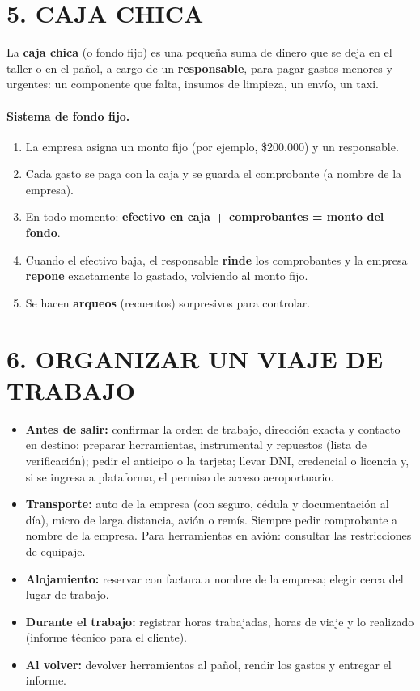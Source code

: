\section*{5. CAJA CHICA}

La \textbf{caja chica} (o fondo fijo) es una pequeña suma de dinero que se deja en el taller o
en el pañol, a cargo de un \textbf{responsable}, para pagar gastos menores y urgentes: un
componente que falta, insumos de limpieza, un envío, un taxi.

\paragraph*{Sistema de fondo fijo.}
\begin{enumerate}
  \item La empresa asigna un monto fijo (por ejemplo, \$200.000) y un responsable.
  \item Cada gasto se paga con la caja y se guarda el comprobante (a nombre de la empresa).
  \item En todo momento: \textbf{efectivo en caja + comprobantes = monto del fondo}.
  \item Cuando el efectivo baja, el responsable \textbf{rinde} los comprobantes y la empresa
        \textbf{repone} exactamente lo gastado, volviendo al monto fijo.
  \item Se hacen \textbf{arqueos} (recuentos) sorpresivos para controlar.
\end{enumerate}

\section*{6. ORGANIZAR UN VIAJE DE TRABAJO}

\begin{itemize}
  \item \textbf{Antes de salir:} confirmar la orden de trabajo, dirección exacta y contacto en
        destino; preparar herramientas, instrumental y repuestos (lista de verificación); pedir
        el anticipo o la tarjeta; llevar DNI, credencial o licencia y, si se ingresa a
        plataforma, el permiso de acceso aeroportuario.
  \item \textbf{Transporte:} auto de la empresa (con seguro, cédula y documentación al día),
        micro de larga distancia, avión o remís. Siempre pedir comprobante a nombre de la
        empresa. Para herramientas en avión: consultar las restricciones de equipaje.
  \item \textbf{Alojamiento:} reservar con factura a nombre de la empresa; elegir cerca del
        lugar de trabajo.
  \item \textbf{Durante el trabajo:} registrar horas trabajadas, horas de viaje y lo realizado
        (informe técnico para el cliente).
  \item \textbf{Al volver:} devolver herramientas al pañol, rendir los gastos y entregar el
        informe.
\end{itemize}

